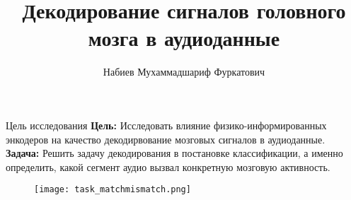 \documentclass{beamer}
\title[\hbox to 56mm{Декодирование сигналов головного мозга в аудиоданные}]{Декодирование сигналов головного мозга в аудиоданные}
\author[М.\,Ф. Набиев]{Набиев Мухаммадшариф Фуркатович}
\institute{Московский физико-технический институт}
\date{\footnotesize
\par\smallskip\emph{Курс:} Моя первая научная статья\par (практика, В.\,В.~Стрижов)
\par\smallskip\emph{Руководитель:} аспирант П.\,А.~Северилов
\par\bigskip\small 2024}
\begin{document}
\begin{frame}
\thispagestyle{empty}
\maketitle
\end{frame}
\begin{frame}{Цель исследования}
\textbf{Цель:} Исследовать влияние физико-информированных энкодеров на качество декодирвование мозговых сигналов в аудиоданные. \\
\textbf{Задача:} Решить задачу декодирования в постановке классификации, а именно определить, какой сегмент аудио вызвал конкретную мозговую активность.
\begin{figure}
    \centering
    \texttt{[image: task\_matchmismatch.png]}
\end{figure}
\end{frame}
\end{document}
